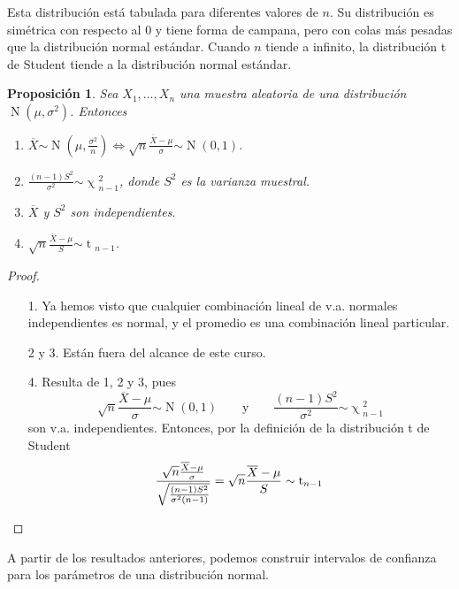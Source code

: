 \documentclass[11pt]{article}
\theoremstyle{plain}
\newtheorem*{pro}{Proposición}
\theoremstyle{definition}
\theoremstyle{remark}
\newcommand{\dists}[1]{\ensuremath{\operatorname{#1}}}  %
\newcommand{\dist}[1]{\ensuremath{\sim \operatorname{#1}}}  %
\begin{document}
      Esta distribución está tabulada para diferentes valores de $n$. Su distribución es simétrica con respecto al 0 y tiene forma de campana, pero con colas más pesadas que la distribución normal estándar. Cuando $n$ tiende a infinito, la distribución t de Student tiende a la distribución normal estándar.

      \begin{pro}
        Sea $X_1, \dots, X_n$ una muestra aleatoria de una distribución $\dists{N}(\mu,\sigma^2)$. Entonces
        \begin{enumerate}
          \item $\displaystyle \overline{X} \dist{N}\left( \mu, \frac{\sigma^2}{n} \right) \Leftrightarrow \sqrt{n} \frac{\overline{X} - \mu}{\sigma} \dist{N}(0,1)$.
          \item $\displaystyle \frac{(n - 1) S^2}{\sigma^2} \dist{\chi}_{n - 1}^2$, donde $S^2$ es la varianza muestral.
          \item $\overline{X}$ y $S^2$ son independientes.
          \item $\displaystyle \sqrt{n} \frac{\overline{X} - \mu}{S} \dist{t}_{n-1}$.
        \end{enumerate}
      \end{pro}
      \begin{proof} \ 
        \begin{enumerate}
          \item[1.] Ya hemos visto que cualquier combinación lineal de v.a. normales independientes es normal, y el promedio es una combinación lineal particular. 
          \item[2 y 3.] Están fuera del alcance de este curso.
          \item[4.] Resulta de 1, 2 y 3, pues
          \[ \sqrt{n} \frac{\overline{X} - \mu}{\sigma} \dist{N}(0,1) \qquad \text{y} \qquad \frac{(n - 1) S^2}{\sigma^2} \dist{\chi}^2_{n - 1} \]
          son v.a. independientes. Entonces, por la definición de la distribución t de Student
          \[ \frac{\sqrt{n} \frac{\overline{X} - \mu}{\sigma}}{\sqrt{\frac{(n - 1) S^2}{\sigma^2 (n - 1)}}} = \sqrt{n} \frac{\overline{X} - \mu}{S} \dist{t}_{n-1} \qedhere \]
        \end{enumerate}
      \end{proof}

      A partir de los resultados anteriores, podemos construir intervalos de confianza para los parámetros de una distribución normal.
\end{document}
